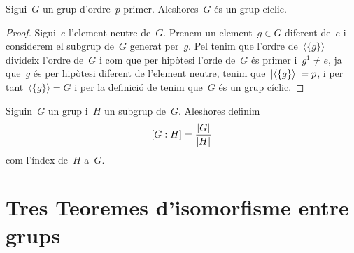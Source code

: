 \documentclass[../../Main.tex]{subfiles}
\begin{document}
	\begin{corollary} %
		Sigui~\(G\) un grup d'ordre~\(p\) primer.
		Aleshores~\(G\) és un grup cíclic.
		\begin{proof}
			Sigui~\(e\) l'element neutre de~\(G\).
			Prenem un element~\(g\in G\) diferent de~\(e\) i considerem el subgrup de~\(G\) generat per~\(g\).
			Pel  tenim que l'ordre de~\(\langle\{g\}\rangle\) divideix l'ordre de~\(G\) i com que per hipòtesi l'orde de~\(G\) és primer i~\(g^{1}\neq e\), ja que~\(g\) és per hipòtesi diferent de l'element neutre, tenim que~\(\abs{\langle\{g\}\rangle}=p\), i per tant~\(\langle\{g\}\rangle=G\) i per la definició de  tenim que~\(G\) és un grup cíclic.
		\end{proof}
	\end{corollary}
	\begin{definition}
		\label{def:l'índex d'un subgrup en un grup}
		Siguin~\(G\) un grup i~\(H\) un subgrup de~\(G\).
		Aleshores definim
		\[
		    [G:H]=\frac{\abs{G}}{\abs{H}}
		\]
		com l'índex de~\(H\) a~\(G\).
	\end{definition}
\section{Tres Teoremes d'isomorfisme entre grups}
\end{document}
